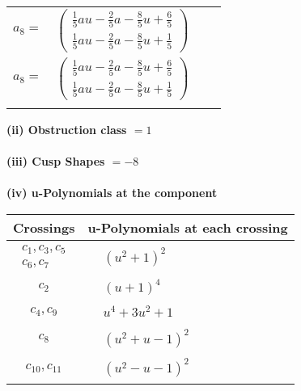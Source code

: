 \documentclass[1p]{elsarticle_modified}
\theoremstyle{definition}
\begin{document}
\begin{tabular}{m{7pt} m{180pt} m{7pt} m{180pt} }
\flushright $a_{8}=$&$\begin{pmatrix}\frac{1}{5} a u-\frac{2}{5} a-\frac{8}{5} u+\frac{6}{5}\\\frac{1}{5} a u-\frac{2}{5} a-\frac{8}{5} u+\frac{1}{5}\end{pmatrix}$\\ \flushright $a_{8}=$&$\begin{pmatrix}\frac{1}{5} a u-\frac{2}{5} a-\frac{8}{5} u+\frac{6}{5}\\\frac{1}{5} a u-\frac{2}{5} a-\frac{8}{5} u+\frac{1}{5}\end{pmatrix}$\\&\end{tabular}
\flushleft \textbf{(ii) Obstruction class $= 1$}\\~\\
\flushleft \textbf{(iii) Cusp Shapes $= -8$}\\~\\
\newpage\renewcommand{\arraystretch}{1}
\flushleft \textbf{(iv) u-Polynomials at the component}\newline \\
\begin{tabular}{m{50pt}|m{274pt}}
Crossings & \hspace{64pt}u-Polynomials at each crossing \\
\hline $$\begin{aligned}c_{1},c_{3},c_{5}\\c_{6},c_{7}\end{aligned}$$&$\begin{aligned}
&(u^2+1)^2
\end{aligned}$\\
\hline $$\begin{aligned}c_{2}\end{aligned}$$&$\begin{aligned}
&(u+1)^4
\end{aligned}$\\
\hline $$\begin{aligned}c_{4},c_{9}\end{aligned}$$&$\begin{aligned}
&u^4+3 u^2+1
\end{aligned}$\\
\hline $$\begin{aligned}c_{8}\end{aligned}$$&$\begin{aligned}
&(u^2+u-1)^2
\end{aligned}$\\
\hline $$\begin{aligned}c_{10},c_{11}\end{aligned}$$&$\begin{aligned}
&(u^2- u-1)^2
\end{aligned}$\\
\hline
\end{tabular}\\~\\
\end{document}
